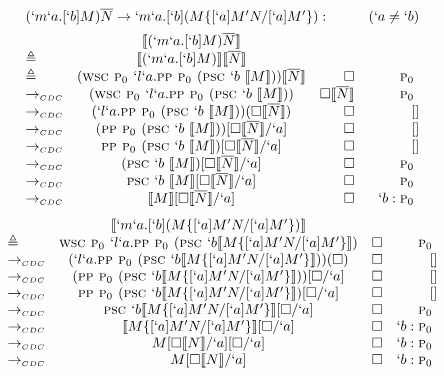\begin{Proof}
\[
\begin{array}{lcrr}
  \prooflabel{(`m`a.[`b]M)\mult{N} \to `m`a.[`b](M\{[`a]M'N/[`a]M'\})} & (`a \not= `b) \\
             & \tr{(`m`a.[`b]M)\mult{N}} \\
  \triangleq & \tr{(`m`a.[`b]M)}\tr{\mult{N}} \\
  \triangleq & (\wsc \gp `l`a.\pp \gp (\psc `b\  \tr{M})) \tr{\mult{N}} & \square & \gp \\
  \tocdc\    & (\wsc \gp `l`a.\pp \gp (\psc `b\  \tr{M})) & \square \tr{\mult{N}} & \gp \\
  \tocdc\    & (`l`a.\pp \gp (\psc `b\ \tr{M}))(\square \tr{\mult{N}}) & \square & []   \\
  \tocdc\    & (\pp \gp (\psc `b\ \tr{M}))[\square \tr{\mult{N}}/`a]   & \square & []   \\
  \tocdc\    & \pp \gp (\psc `b\ \tr{M})[\square \tr{\mult{N}}/`a]     & \square & []   \\
  \tocdc\    & (\psc `b\ \tr{M})[\square \tr{\mult{N}}/`a]             & \square & \gp  \\
  \tocdc\    & \psc `b\ \tr{M}[\square \tr{\mult{N}}/`a]               & \square & \gp  \\
  \tocdc\    & \tr{M}[\square \tr{\mult{N}}/`a]                        & \square & `b:\gp  \\
\end{array}
\]
\[
\begin{array}{lcrr}
             & \llbracket `m`a.[`b](M\{[`a]M'N/[`a]M'\}) \rrbracket \\
  \triangleq & \textsc{wsc } \textsc{p$_0$ } `l`a. \textsc{pp } \textsc{p$_0$ } (\textsc{psc } `b \llbracket M\{[`a]M'N/[`a]M'\} \rrbracket)   & \square & \textsc{p$_0$ } \\
  \to_{\scriptscriptstyle{CDC}}   & (`l`a. \textsc{pp } \textsc{p$_0$ } (\textsc{psc } `b \llbracket M\{[`a]M'N/[`a]M'\} \rrbracket))(\square) & \square & [] \\
  \to_{\scriptscriptstyle{CDC}}   & (\textsc{pp } \textsc{p$_0$ } (\textsc{psc } `b \llbracket M\{[`a]M'N/[`a]M'\} \rrbracket))[\square/`a]    & \square & [] \\
  \to_{\scriptscriptstyle{CDC}}   & \textsc{pp } \textsc{p$_0$ } (\textsc{psc } `b \llbracket M\{[`a]M'N/[`a]M'\} \rrbracket)[\square/`a]      & \square & [] \\
  \to_{\scriptscriptstyle{CDC}}   & \textsc{psc } `b \llbracket M\{[`a]M'N/[`a]M'\} \rrbracket[\square/`a]                & \square & \textsc{p$_0$ } \\
  \to_{\scriptscriptstyle{CDC}}   & \llbracket M\{[`a]M'N/[`a]M'\} \rrbracket[\square/`a]                        & \square & `b:\textsc{p$_0$ } \\
  \to_{\scriptscriptstyle{CDC}}   & M[\square \llbracket N \rrbracket/`a][\square/`a]                          & \square & `b:\textsc{p$_0$ } \\
  \to_{\scriptscriptstyle{CDC}}   & M[\square \llbracket N \rrbracket/`a]                                      & \square & `b:\textsc{p$_0$ } \\

\end{array}\]
\end{Proof}
